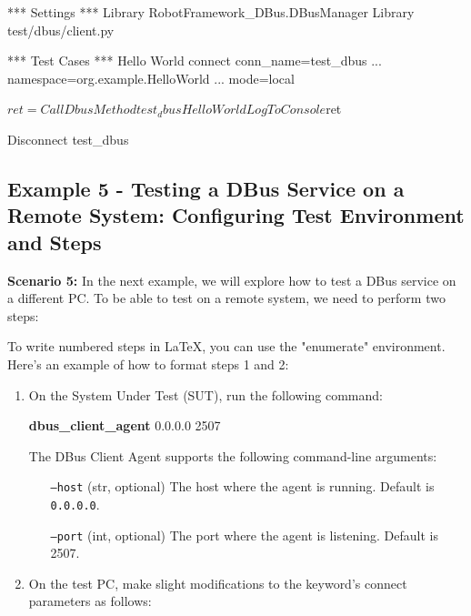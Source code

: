\begin{robotcode}
*** Settings ***
Library    RobotFramework_DBus.DBusManager
Library    test/dbus/client.py
 
*** Test Cases ***
Hello World
   connect    conn_name=test_dbus    
   ...        namespace=org.example.HelloWorld
   ...        mode=local

   ${ret}=    Call Dbus Method    test_dbus    Hello    World
   Log To Console    ${ret}
   
   Disconnect    test_dbus
\end{robotcode}


\hypertarget{description-example5}{%
\subsection{\texorpdfstring{\textbf{Example 5 - Testing a DBus Service on a Remote System: Configuring Test Environment and Steps}}{Example 5 - Testing a DBus Service on a Remote System: Configuring Test Environment and Steps}}\label{description-example5}}

\textbf{Scenario 5:}
In the next example, we will explore how to test a DBus service on a different PC. To be able to test on a remote system, we need to perform two steps:

To write numbered steps in LaTeX, you can use the "enumerate" environment. Here's an example of how to format steps 1 and 2:

\begin{enumerate}
\item On the System Under Test (SUT), run the following command:

	\textbf{dbus\_client\_agent}  0.0.0.0  2507
		
		The DBus Client Agent supports the following command-line arguments:

		\begin{itemize}
			\setlength{\itemindent}{10em}
			\item [\texttt{--host} (str, optional)] The host where the agent is running. Default is \texttt{0.0.0.0}.
			\item [\texttt{--port} (int, optional)] The port where the agent is listening. Default is 2507.
		\end{itemize}

\item On the test PC, make slight modifications to the keyword's connect parameters as follows:
\end{enumerate}

